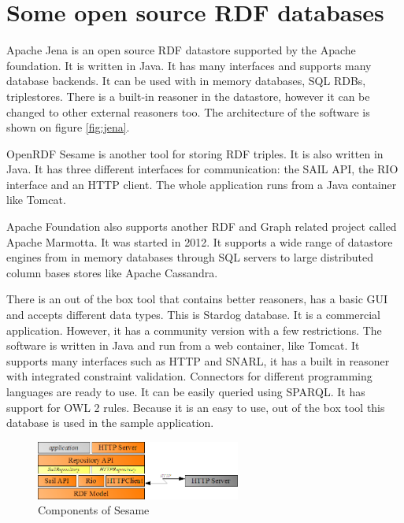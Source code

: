 \section{Some open source RDF databases} 

Apache Jena is an open source RDF datastore supported by the Apache foundation. It is written in Java\cite{jena}. It has many interfaces and supports many database backends. It can be used with in memory databases, SQL RDBs, triplestores. There is a built-in reasoner in the datastore, however it can be changed to other external reasoners too. The architecture of the software is shown on figure \ref{fig:jena}.

OpenRDF Sesame is another tool for storing RDF triples. It is also written in Java. It has three different interfaces for communication: the SAIL API, the RIO interface and an HTTP client. The whole application runs from a Java container like Tomcat.

Apache Foundation also supports another RDF and Graph related project called Apache Marmotta. It was started in 2012. It supports a wide range of datastore engines from in memory databases through SQL servers to large distributed column bases stores like Apache Cassandra. 

There is an out of the box tool that contains better reasoners, has a basic GUI and accepts different data types. This is Stardog database. It is a commercial application. However, it has a community version with a few restrictions. The software is written in Java and run from a web container, like Tomcat. It supports many interfaces such as HTTP and SNARL, it has a built in reasoner with integrated constraint validation. Connectors for different programming languages are ready to use. It can be easily queried using SPARQL. It has support for OWL 2 rules. Because it is an easy to use, out of the box tool this database  is used in the sample application.

\begin{figure}[h]
\centering
\includegraphics[width=0.6\textwidth]{figures/sesame-components.png}
\caption{Components of Sesame\label{fig:sesame}}
\end{figure}


